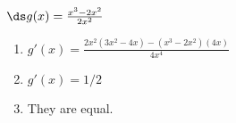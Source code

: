 {$\ds g(x)= \frac{x^3-2x^2}{2x^2}$
}
{\begin{enumerate}
\item		$g'(x) = \frac{2x^2(3x^2-4x)-(x^3-2x^2)(4x)}{4x^4}$
\item		$g'(x) = 1/2$
\item		They are equal.
\end{enumerate}
}
